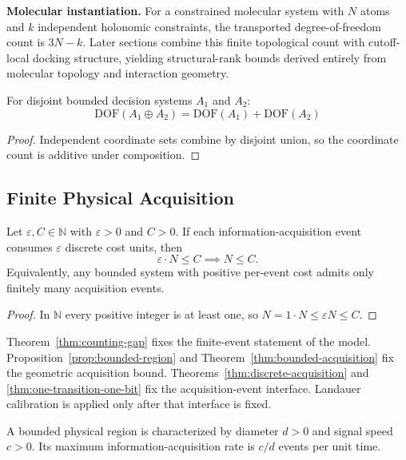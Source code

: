 \textbf{Molecular instantiation.} For a constrained molecular system with $N$ atoms and $k$ independent holonomic constraints, the transported degree-of-freedom count is $3N-k$. Later sections combine this finite topological count with cutoff-local docking structure, yielding structural-rank bounds derived entirely from molecular topology and interaction geometry.

\begin{proposition}\label{prop:dof-additive}
For disjoint bounded decision systems $A_1$ and $A_2$:
\[
\mathrm{DOF}(A_1 \oplus A_2) = \mathrm{DOF}(A_1) + \mathrm{DOF}(A_2)
\]
\end{proposition}

\begin{proof}
Independent coordinate sets combine by disjoint union, so the coordinate count is additive under composition.
\end{proof}

\subsection{Finite Physical Acquisition}

\begin{theorem}\label{thm:counting-gap}
Let $\varepsilon, C \in \mathbb{N}$ with $\varepsilon>0$ and $C>0$. If each information-acquisition event consumes $\varepsilon$ discrete cost units, then
\[
\varepsilon \cdot N \le C \implies N \le C.
\]
Equivalently, any bounded system with positive per-event cost admits only finitely many acquisition events.
\end{theorem}

\begin{proof}
In $\mathbb{N}$ every positive integer is at least one, so $N = 1\cdot N \le \varepsilon N \le C$.
\end{proof}

Theorem~\ref{thm:counting-gap} fixes the finite-event statement of the model. Proposition~\ref{prop:bounded-region} and Theorem~\ref{thm:bounded-acquisition} fix the geometric acquisition bound. Theorems~\ref{thm:discrete-acquisition} and \ref{thm:one-transition-one-bit} fix the acquisition-event interface. Landauer calibration is applied only after that interface is fixed.

\begin{proposition}\label{prop:bounded-region}
A bounded physical region is characterized by diameter $d>0$ and signal speed $c>0$. Its maximum information-acquisition rate is $c/d$ events per unit time.
\end{proposition}

